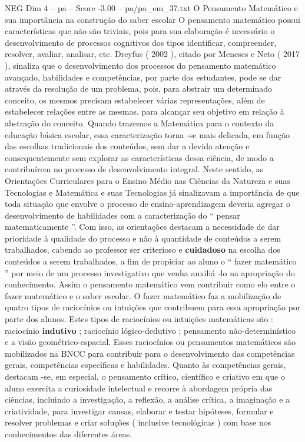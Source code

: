 \begin{textsample}{NEG Dim 4 – pa – Score -3.00 – pa/pa\_em\_37.txt}  \label{ex:f4_neg_272}
O Pensamento Matemático e sua importância na construção do saber escolar O pensamento matemático possui características que não são triviais, pois para sua elaboração é necessário o desenvolvimento de processos cognitivos dos tipos identificar, compreender, resolver, avaliar, analisar, etc.
Dreyfus ( 2002 ), citado por Meneses e Neto ( 2017 ), sinaliza que o desenvolvimento dos processos do pensamento matemático avançado, habilidades e competências, por parte dos estudantes, pode se dar através da resolução de um problema, pois, para abstrair um determinado conceito, os mesmos precisam estabelecer várias representações, além de estabelecer relações entre as mesmas, para alcançar seu objetivo em relação à abstração do conceito.
Quando trazemos a Matemática para o contexto da educação básica escolar, essa caracterização torna -se mais delicada, em função das escolhas tradicionais dos conteúdos, sem dar a devida atenção e consequentemente sem explorar as características dessa ciência, de modo a contribuírem no processo de desenvolvimento integral.
Neste sentido, as Orientações Curriculares para o Ensino Médio nas Ciências da Natureza e suas Tecnologias e Matemática e suas Tecnologias já sinalizavam a importância de que toda situação que envolve o processo de ensino-aprendizagem deveria agregar o desenvolvimento de habilidades com a caracterização do “ pensar matematicamente ”.
Com isso, as orientações destacam a necessidade de dar prioridade à qualidade do processo e não à quantidade de conteúdos a serem trabalhados, cabendo ao professor ser criterioso e \textbf{cuidadoso} na escolha dos conteúdos a serem trabalhados, a fim de propiciar ao aluno o “ fazer matemático ” por meio de um processo investigativo que venha auxiliá -lo na apropriação do conhecimento.
Assim o pensamento matemático vem contribuir como elo entre o fazer matemático e o saber escolar.
O fazer matemático faz a mobilização de quatro tipos de raciocínios ou intuições que contribuem para essa apropriação por parte dos alunos.
Estes tipos de raciocínios ou intuições matemáticas são : raciocínio \textbf{indutivo} ; raciocínio lógico-dedutivo ; pensamento não-determinístico e a visão geométrico-espacial.
Esses raciocínios ou pensamentos matemáticos são mobilizados na BNCC para contribuir para o desenvolvimento das competências gerais, competências específicas e habilidades.
Quanto às competências gerais, destacam -se, em especial, o pensamento crítico, científico e criativo em que o aluno exercita a curiosidade intelectual e recorre à abordagem própria das ciências, incluindo a investigação, a reflexão, a análise crítica, a imaginação e a criatividade, para investigar causas, elaborar e testar hipóteses, formular e resolver problemas e criar soluções ( inclusive tecnológicas ) com base nos conhecimentos das diferentes áreas.

\end{textsample}
